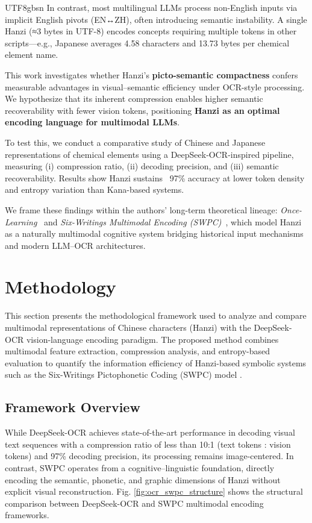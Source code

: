 \documentclass[conference]{IEEEtran}
\begin{document}
\begin{CJK*}{UTF8}{gbsn}
In contrast, most multilingual LLMs process non-English inputs via implicit English pivots (EN↔ZH), often introducing semantic instability. A single Hanzi (≈3 bytes in UTF-8) encodes concepts requiring multiple tokens in other scripts—e.g., Japanese averages 4.58 characters and 13.73 bytes per chemical element name.

This work investigates whether Hanzi’s \textbf{picto-semantic compactness} confers measurable advantages in visual–semantic efficiency under OCR-style processing. We hypothesize that its inherent compression enables higher semantic recoverability with fewer vision tokens, positioning \textbf{Hanzi as an optimal encoding language for multimodal LLMs}.

To test this, we conduct a comparative study of Chinese and Japanese representations of chemical elements using a DeepSeek-OCR-inspired pipeline, measuring (i) compression ratio, (ii) decoding precision, and (iii) semantic recoverability. Results show Hanzi sustains ~97\% accuracy at lower token density and entropy variation than Kana-based systems.

We frame these findings within the authors’ long-term theoretical lineage: \textit{Once-Learning}~\cite{weigang1999study,weigang2022hol,althoff2022once} and \textit{Six-Writings Multimodal Encoding (SWPC)}~\cite{weigang2024six}, which model Hanzi as a naturally multimodal cognitive system bridging historical input mechanisms and modern LLM–OCR architectures.

\section{Methodology}
\label{sec:methodology}
This section presents the methodological framework used to analyze and compare multimodal representations of Chinese characters (Hanzi) with the DeepSeek-OCR vision-language encoding paradigm. The proposed method combines multimodal feature extraction, compression analysis, and entropy-based evaluation to quantify the information efficiency of Hanzi-based symbolic systems such as the Six-Writings Pictophonetic Coding (SWPC) model \cite{weigang2024six}.

\subsection{Framework Overview}

While DeepSeek-OCR \citep{wei2025deepseek} achieves state-of-the-art performance in decoding visual text sequences with a compression ratio of less than 10:1 (text tokens : vision tokens) and 97\% decoding precision, its processing remains image-centered. In contrast, SWPC operates from a cognitive–linguistic foundation, directly encoding the semantic, phonetic, and graphic dimensions of Hanzi without explicit visual reconstruction. Fig. \ref{fig:ocr_swpc_structure} shows the structural comparison between DeepSeek-OCR and SWPC multimodal encoding frameworks. 


\end{CJK*}
\end{document}
